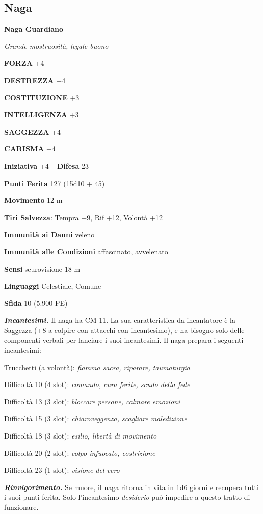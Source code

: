 \begin{multicols}{2}
\subsection{Naga}

\medskip{}\textbf{Naga Guardiano}

\emph{Grande mostruosità, legale buono}

\textbf{FORZA} +4

\textbf{DESTREZZA} +4

\textbf{COSTITUZIONE} +3

\textbf{INTELLIGENZA} +3

\textbf{SAGGEZZA} +4

\textbf{CARISMA} +4

\textbf{Iniziativa} +4 -- \textbf{Difesa} 23

\textbf{Punti Ferita} 127 (15d10 + 45)

\textbf{Movimento} 12 m

\textbf{Tiri Salvezza}: Tempra +9, Rif +12, Volontà +12

\textbf{Immunità ai Danni} veleno

\textbf{Immunità alle Condizioni} affascinato, avvelenato 

\textbf{Sensi} scurovisione 18 m 

\textbf{Linguaggi} Celestiale, Comune 

\textbf{Sfida} 10 (5.900 PE)

\emph{\textbf{Incantesimi.}} Il naga ha CM 11. La sua caratteristica da incantatore è la Saggezza (+8 a colpire con attacchi con incantesimo), e ha bisogno solo delle componenti verbali per lanciare i suoi incantesimi. Il naga prepara i seguenti incantesimi:

Trucchetti (a volontà): \emph{fiamma sacra, riparare, taumaturgia}

Difficoltà 10 (4 slot): \emph{comando, cura ferite, scudo della fede}

Difficoltà 13 (3 slot): \emph{bloccare persone, calmare emozioni}

Difficoltà 15 (3 slot): \emph{chiaroveggenza, scagliare maledizione}

Difficoltà 18 (3 slot): \emph{esilio, libertà di movimento}

Difficoltà 20 (2 slot): \emph{colpo infuocato, costrizione}

Difficoltà 23 (1 slot): \emph{visione del vero}

\emph{\textbf{Rinvigorimento.}} Se muore, il naga ritorna in vita in 1d6 giorni e recupera tutti i suoi punti ferita. Solo l'incantesimo \emph{desiderio} può impedire a questo tratto di funzionare.


\end{multicols}
